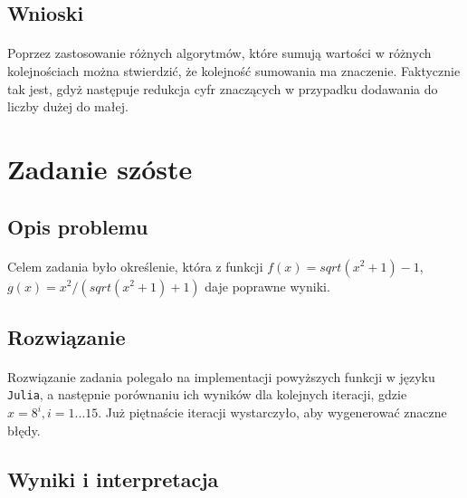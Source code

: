 \documentclass[a4paper]{article}
\begin{document}
\subsection{Wnioski}
\paragraph{}
Poprzez zastosowanie różnych algorytmów, które sumują wartości w różnych kolejnościach można stwierdzić, że kolejność sumowania ma znaczenie. Faktycznie tak jest, gdyż następuje redukcja cyfr znaczących w przypadku dodawania do liczby dużej do małej.
\section{Zadanie szóste}

\subsection{Opis problemu}
\paragraph{}
Celem zadania było określenie, która z funkcji $f(x) = sqrt(x^2 + 1) - 1$, $g(x) = x^2 / (sqrt(x^2 + 1) + 1)$ daje poprawne wyniki.

\subsection{Rozwiązanie}
\paragraph{}
Rozwiązanie zadania polegało na implementacji powyższych funkcji w języku \texttt{Julia}, a następnie porównaniu ich wyników dla kolejnych iteracji, gdzie $x = 8^i, i = 1...15$. Już piętnaście iteracji wystarczyło, aby wygenerować znaczne błędy.

\subsection{Wyniki i interpretacja}
\paragraph{}
\end{document}
